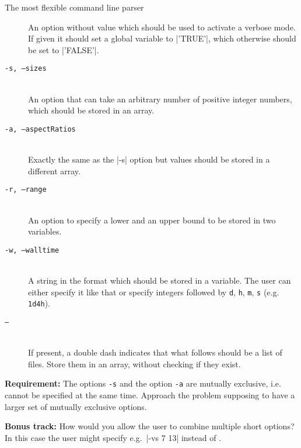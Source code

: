 \begin{exercise}{The most flexible command line parser}
\begin{description}
            An option without value which should be used to activate a verbose mode.
            If given it should set a global variable to \bash|'TRUE'|, which otherwise should be set to \bash|'FALSE'|.
        \item[\texttt{-s, --sizes}] ~\\
            An option that can take an arbitrary number of positive integer numbers, which should be stored in an array.
        \item[\texttt{-a, --aspectRatios}] ~\\
            Exactly the same as the \bash|-s| option but values should be stored in a different array.
        \item[\texttt{-r, --range}] ~\\
            An option to specify a lower and an upper bound to be stored in two variables.
        \item[\texttt{-w, --walltime}] ~\\
            A string in the format  which should be stored in a variable.
            The user can either specify it like that or specify integers followed by \texttt{d}, \texttt{h}, \texttt{m}, \texttt{s} (e.g. \texttt{1d4h}).
        \item[\texttt{--}] ~\\
            If present, a double dash indicates that what follows should be a list of files.
            Store them in an array, without checking if they exist.
    \end{description}
    \textbf{Requirement:} The options \texttt{-s} and the option \texttt{-a} are mutually exclusive, i.e. cannot be specified at the same time.
    Approach the problem supposing to have a larger set of mutually exclusive options.

    \medskip
    \textbf{Bonus track:} How would you allow the user to combine multiple short options?
    In this case the user might specify e.g.\ \bash|-vs 7 13| instead of .
\end{exercise}
